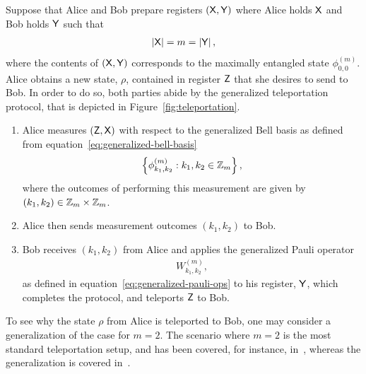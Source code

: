 Suppose that Alice and Bob prepare registers $(\mathsf{X},\mathsf{Y})$ where Alice holds $\mathsf{X}$ and Bob holds $\mathsf{Y}$ such that 
\begin{align}
	\left\lvert \mathsf{X} \right\rvert = m = \left\lvert \mathsf{Y} \right\rvert,
\end{align}
where the contents of $(\mathsf{X},\mathsf{Y})$ corresponds to the maximally entangled state $\phi_{0,0}^{(m)}$. Alice obtains a new state, $\rho$, contained in register $\mathsf{Z}$ that she desires to send to Bob. In order to do so, both parties abide by the generalized teleportation protocol, that is depicted in Figure~\ref{fig:teleportation}.

\begin{enumerate}
\item Alice measures $(\mathsf{Z},\mathsf{X})$ with respect to the generalized Bell basis as defined from equation~\eqref{eq:generalized-bell-basis}
\begin{align}
	\left \{ \phi^{(m)}_{k_1, k_2} : k_1, k_2 \in \mathbb{Z}_m \right \},
\end{align}
where the outcomes of performing this measurement are given by $(k_1,k_2) \in \mathbb{Z}_{m} \times \mathbb{Z}_{m}$. 

\item Alice then sends measurement outcomes $(k_1,k_2)$ to Bob.

\item Bob receives $(k_1,k_2)$ from Alice and applies the generalized Pauli operator 
	\begin{align}
		W_{k_1,k_2}^{(m)},
	\end{align}
as defined in equation~\eqref{eq:generalized-pauli-ops} to his register, $\mathsf{Y}$, which completes the protocol, and teleports $\mathsf{Z}$ to Bob. 
\end{enumerate}
To see why the state $\rho$ from Alice is teleported to Bob, one may consider a generalization of the case for $m = 2$. The scenario where $m = 2$ is the most standard teleportation setup, and has been covered, for instance, in~\cite{Nielsen2001}, whereas the generalization is covered in~\cite{Wilde2013}.

